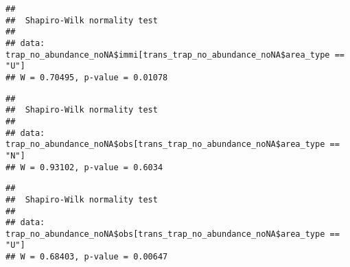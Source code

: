 \documentclass[
]{article}
\newenvironment{Shaded}{\begin{snugshade}}{\end{snugshade}}
\newcommand{\FunctionTok}[1]{\textcolor[rgb]{0.13,0.29,0.53}{\textbf{#1}}}
\newcommand{\NormalTok}[1]{#1}
\newcommand{\SpecialCharTok}[1]{\textcolor[rgb]{0.81,0.36,0.00}{\textbf{#1}}}
\newcommand{\StringTok}[1]{\textcolor[rgb]{0.31,0.60,0.02}{#1}}
\begin{document}
\begin{Shaded}
\end{Shaded}

\begin{verbatim}
## 
##  Shapiro-Wilk normality test
## 
## data:  trap_no_abundance_noNA$immi[trans_trap_no_abundance_noNA$area_type == "U"]
## W = 0.70495, p-value = 0.01078
\end{verbatim}

\begin{Shaded}
\end{Shaded}

\begin{verbatim}
## 
##  Shapiro-Wilk normality test
## 
## data:  trap_no_abundance_noNA$obs[trans_trap_no_abundance_noNA$area_type == "N"]
## W = 0.93102, p-value = 0.6034
\end{verbatim}

\begin{Shaded}
\end{Shaded}

\begin{verbatim}
## 
##  Shapiro-Wilk normality test
## 
## data:  trap_no_abundance_noNA$obs[trans_trap_no_abundance_noNA$area_type == "U"]
## W = 0.68403, p-value = 0.00647
\end{verbatim}

\begin{Shaded}
\end{Shaded}
\end{document}

